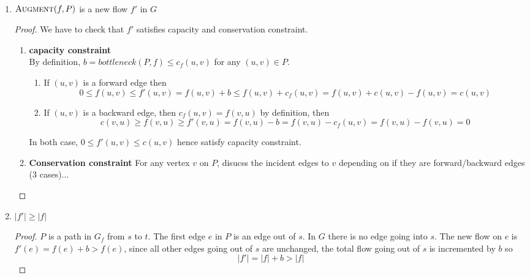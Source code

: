 \documentclass[11pt]{article}
\begin{document}
\begin{solution}
  \begin{proposition*}
    $ $\\
    \begin{enumerate}
      \item $\textsc{Augment}(f, P)$ is a new flow $f'$ in $G$
      \begin{proof}
        We have to check that $f'$ satisfies capacity and conservation constraint.
        \begin{enumerate}
          \item \textbf{capacity constraint} \\
          By definition, $b = bottleneck(P,f)\leq c_f(u,v)$ for any $(u,v)\in P$.
            \begin{enumerate}
              \item If $(u,v)$ is a forward edge then
                \[
                  0 \leq f(u,v) \leq f'(u,v) = f(u,v) + b \leq f(u,v) + c_f(u,v) = f(u,v) + c(u,v) - f(u,v) = c(u,v)
                \]
              \item   If $(u,v)$ is a backward edge, then $c_f(u,v) = f(v, u)$ by definition, then
                \[
                  c(v, u) \geq f(v, u) \geq f'(v, u) = f(v, u) - b = f(v, u) - c_f(u,v) = f(v, u) - f(v, u) = 0
                \]
            \end{enumerate}
            In both case, $ 0\leq f'(u,v) \leq c(u,v)$ hence satisfy capacity constraint.
            \item \textbf{Conservation constraint} For any vertex $v$ on $P$, disucss the incident edges to $v$ depending on if they are forward/backward edges (3 cases)...
        \end{enumerate}
      \end{proof}
      \item $| f' | \geq |f|$
      \begin{proof}
        $P$ is a path in $G_f$ from $s$ to $t$. The first edge $e$ in $P$ is an edge out of $s$. In $G$ there is no edge going into $s$. The new flow on $e$ is $f'(e) = f(e) + b > f(e)$, since all other edges going out of $s$ are unchanged, the total flow going out of $s$ is incremented by $b$ so
        \[
          |f'|  = |f| + b > |f|
        \]
      \end{proof}
    \end{enumerate}

  \end{proposition*}


\end{solution}
\end{document}
